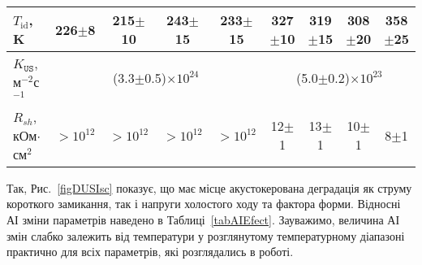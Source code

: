 \begin{table}
\begin{tabular}{|l|c|c|c|c|c|c|c|c|}
$T_\mathrm{id}$, K&226$\pm$8&215$\pm$10&243$\pm$15&233$\pm$15&327$\pm$10&319$\pm$15&308$\pm$20&358$\pm$25\\ \hline
$K_\mathtt{US}$, м$^{-2}$с$^{-1}$&\multicolumn{4}{c|}{(3.3$\pm$0.5)$\times10^{24}$}&\multicolumn{4}{|c|}{(5.0$\pm$0.2)$\times10^{23}$}\\ \hline
$R_{sh}$, кОм$\cdot$см$^2$&$>10^{12}$&$>10^{12}$&$>10^{12}$&$>10^{12}$&12$\pm$1&13$\pm$1&10$\pm$1&8$\pm$1\\ \hline
\end{tabular}
\end{table}

Так, Рис.~\ref{figDUSIsc} показує, що має місце акустокерована деградація як струму короткого замикання, так і напруги холостого ходу та
фактора форми.
Відносні АІ зміни  параметрів наведено в Таблиці~\ref{tabAIEfect}.
Зауважимо, величина АІ змін слабко залежить від температури у розглянутому температурному діапазоні практично для всіх параметрів, які розглядались в роботі.


